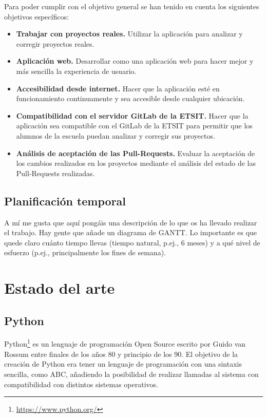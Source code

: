 \documentclass[a4paper, 12pt]{book}
\begin{document}
Para poder cumplir con el objetivo general se han tenido en cuenta los siguientes objetivos específicos:

\begin{itemize}
	\item \textbf{Trabajar con proyectos reales.} Utilizar la aplicación para analizar y corregir proyectos reales.
	\item \textbf{Aplicación web.} Desarrollar como una aplicación web para hacer mejor y más sencilla la experiencia de usuario.
	\item \textbf{Accesibilidad desde internet.} Hacer que la aplicación esté en funcionamiento continuamente y sea accesible desde cualquier ubicación.
	\item \textbf{Compatibilidad con el servidor GitLab de la ETSIT.} Hacer que la aplicación sea compatible con el GitLab de la ETSIT para permitir que los alumnos de la escuela puedan analizar y corregir sus proyectos.
	\item \textbf{Análisis de aceptación de las Pull-Requests.} Evaluar la aceptación de los cambios realizados en los proyectos mediante el análisis del estado de las Pull-Requests realizadas.
\end{itemize}


\section{Planificación temporal}
\label{sec:planificacion-temporal}
A mí me gusta que aquí pongáis una descripción de lo que os ha llevado realizar el trabajo.
Hay gente que añade un diagrama de GANTT.
Lo importante es que quede claro cuánto tiempo llevas (tiempo natural, p.ej., 6 meses) y a qué nivel de esfuerzo (p.ej., principalmente los fines de semana).



\cleardoublepage
\chapter{Estado del arte}
\label{chap:estado}

\section{Python} 
\label{sec:python}
Python\footnote{\url{https://www.python.org/}} es un lenguaje de programación Open Source escrito por Guido van Rossum entre finales de los años 80 y principio de los 90. El objetivo de la creación de Python era tener un lenguaje de programación con una sintaxis sencilla, como ABC, añadiendo la posibilidad de realizar llamadas al sistema con compatibilidad con distintos sistemas operativos.\cite{python}
\end{document}
